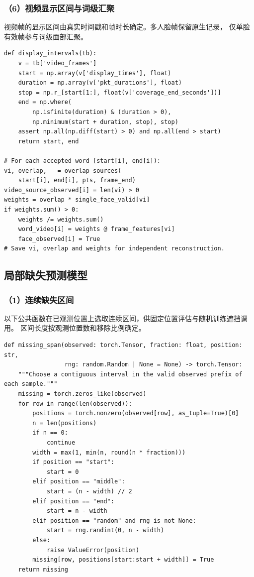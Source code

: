 \subsubsection*{（6）视频显示区间与词级汇聚}
视频帧的显示区间由真实时间戳和帧时长确定。多人脸帧保留原生记录，
仅单脸有效帧参与词级面部汇聚。
\begin{lstlisting}
def display_intervals(tb):
    v = tb['video_frames']
    start = np.array(v['display_times'], float)
    duration = np.array(v['pkt_durations'], float)
    stop = np.r_[start[1:], float(v['coverage_end_seconds'])]
    end = np.where(
        np.isfinite(duration) & (duration > 0),
        np.minimum(start + duration, stop), stop)
    assert np.all(np.diff(start) > 0) and np.all(end > start)
    return start, end

# For each accepted word [start[i], end[i]):
vi, overlap, _ = overlap_sources(
    start[i], end[i], pts, frame_end)
video_source_observed[i] = len(vi) > 0
weights = overlap * single_face_valid[vi]
if weights.sum() > 0:
    weights /= weights.sum()
    word_video[i] = weights @ frame_features[vi]
    face_observed[i] = True
# Save vi, overlap and weights for independent reconstruction.
\end{lstlisting}

\subsection{局部缺失预测模型}
\subsubsection*{（1）连续缺失区间}
以下公共函数在已观测位置上选取连续区间，供固定位置评估与随机训练遮挡调用。
区间长度按观测位置数和移除比例确定。

\begin{lstlisting}
def missing_span(observed: torch.Tensor, fraction: float, position: str,
                 rng: random.Random | None = None) -> torch.Tensor:
    """Choose a contiguous interval in the valid observed prefix of each sample."""
    missing = torch.zeros_like(observed)
    for row in range(len(observed)):
        positions = torch.nonzero(observed[row], as_tuple=True)[0]
        n = len(positions)
        if n == 0:
            continue
        width = max(1, min(n, round(n * fraction)))
        if position == "start":
            start = 0
        elif position == "middle":
            start = (n - width) // 2
        elif position == "end":
            start = n - width
        elif position == "random" and rng is not None:
            start = rng.randint(0, n - width)
        else:
            raise ValueError(position)
        missing[row, positions[start:start + width]] = True
    return missing
\end{lstlisting}

